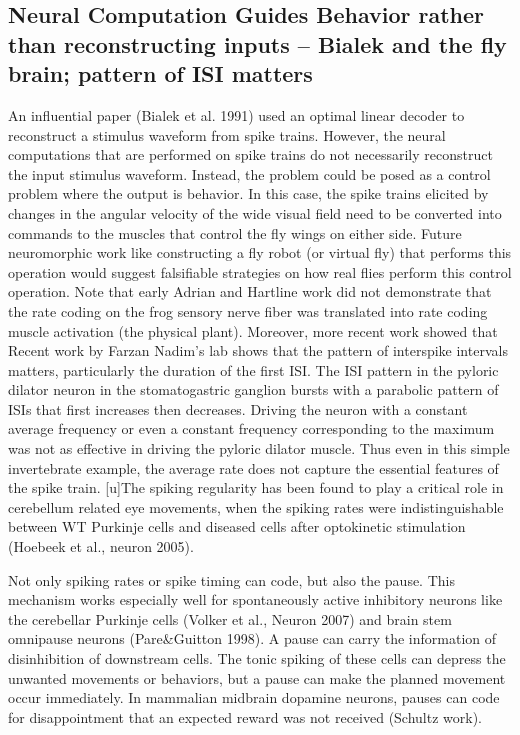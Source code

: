 \documentclass[12pt]{article}
\begin{document}
\subsection{Neural Computation Guides Behavior rather than reconstructing inputs -- Bialek and the fly brain; pattern of ISI matters}
An influential paper (Bialek et al. 1991) used an optimal linear decoder to reconstruct a stimulus waveform from spike trains. However, the neural computations that are
performed on spike trains do not necessarily reconstruct the input stimulus waveform. Instead, the problem could be posed as a control problem where the output is behavior. In
this case, the spike trains elicited by changes in the angular velocity of the wide visual field need to be converted into commands to the muscles that control the fly wings
on either side. Future neuromorphic work like constructing a fly robot (or virtual fly) that performs this operation would suggest falsifiable strategies on how real flies
perform this control operation. Note that early Adrian and Hartline work did not demonstrate that the rate coding on the frog sensory nerve fiber was translated into rate
coding muscle activation (the physical plant). Moreover, more recent work showed that Recent work by Farzan Nadim’s lab shows that the pattern of
interspike intervals matters, particularly the duration of the first ISI. The ISI pattern in the pyloric dilator neuron in the stomatogastric ganglion bursts with a parabolic
pattern of ISIs that first increases then decreases. Driving the neuron with a constant average frequency or even a constant frequency corresponding to the maximum was not as
effective in driving the pyloric dilator muscle. Thus even in this simple invertebrate example, the average rate does not capture the essential features of the spike train.
[u]The spiking regularity has been found to play a critical role in cerebellum related eye movements, when the spiking rates were indistinguishable between WT Purkinje cells
and diseased cells after optokinetic stimulation (Hoebeek et al., neuron 2005).
 
Not only spiking rates or spike timing can code, but also the pause. This mechanism works especially well for spontaneously active inhibitory neurons like the cerebellar
Purkinje cells (Volker et al., Neuron 2007) and brain stem omnipause neurons (Pare\&Guitton 1998). A pause can carry the information of disinhibition of downstream cells. The
tonic spiking of these cells can depress the unwanted movements or behaviors, but a pause can make the planned movement occur immediately. In mammalian midbrain dopamine
neurons, pauses can code for disappointment that an expected reward was not received (Schultz work).
\end{document}
